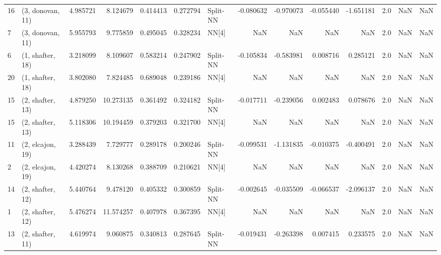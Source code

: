 \begin{tabular}{llrrrrlrrrrrrl}
16 &  (3, donovan, 11) &   4.985721 &   8.124679 &   0.414413 &  0.272794 &    Split-NN &       -0.080632 &     -0.970073 &      -0.055440 &    -1.651181 &            2.0 &    NaN &              NaN \\
7  &  (3, donovan, 11) &   5.955793 &   9.775859 &   0.495045 &  0.328234 &       NN[4] &             NaN &           NaN &            NaN &          NaN &            2.0 &    NaN &              NaN \\
6  &  (1, shafter, 18) &   3.218099 &   8.109607 &   0.583214 &  0.247902 &    Split-NN &       -0.105834 &     -0.583981 &       0.008716 &     0.285121 &            2.0 &    NaN &              NaN \\
20 &  (1, shafter, 18) &   3.802080 &   7.824485 &   0.689048 &  0.239186 &       NN[4] &             NaN &           NaN &            NaN &          NaN &            2.0 &    NaN &              NaN \\
15 &  (2, shafter, 13) &   4.879250 &  10.273135 &   0.361492 &  0.324182 &    Split-NN &       -0.017711 &     -0.239056 &       0.002483 &     0.078676 &            2.0 &    NaN &              NaN \\
15 &  (2, shafter, 13) &   5.118306 &  10.194459 &   0.379203 &  0.321700 &       NN[4] &             NaN &           NaN &            NaN &          NaN &            2.0 &    NaN &              NaN \\
11 &  (2, elcajon, 19) &   3.288439 &   7.729777 &   0.289178 &  0.200246 &    Split-NN &       -0.099531 &     -1.131835 &      -0.010375 &    -0.400491 &            2.0 &    NaN &              NaN \\
2  &  (2, elcajon, 19) &   4.420274 &   8.130268 &   0.388709 &  0.210621 &       NN[4] &             NaN &           NaN &            NaN &          NaN &            2.0 &    NaN &              NaN \\
14 &  (2, shafter, 12) &   5.440764 &   9.478120 &   0.405332 &  0.300859 &    Split-NN &       -0.002645 &     -0.035509 &      -0.066537 &    -2.096137 &            2.0 &    NaN &              NaN \\
1  &  (2, shafter, 12) &   5.476274 &  11.574257 &   0.407978 &  0.367395 &       NN[4] &             NaN &           NaN &            NaN &          NaN &            2.0 &    NaN &              NaN \\
13 &  (2, shafter, 11) &   4.619974 &   9.060875 &   0.340813 &  0.287645 &    Split-NN &       -0.019431 &     -0.263398 &       0.007415 &     0.233575 &            2.0 &    NaN &              NaN \\

\end{tabular}
